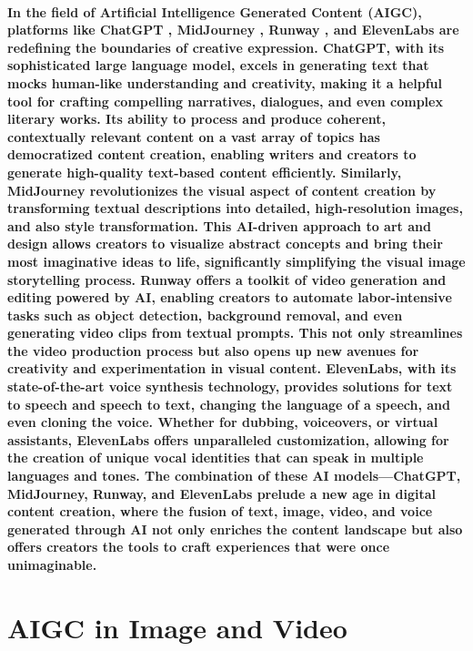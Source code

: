 \documentclass[11pt,a4paper,oneside]{report}
\begin{document}
\paragraph{In the field of Artificial Intelligence Generated Content (AIGC), platforms like ChatGPT \cite{leiter2023chatgpt} \cite{openai2023gpt}, MidJourney \cite{MidjourneyExplore}, Runway \cite{runwayml}, and ElevenLabs \cite{elevenlabs} are redefining the boundaries of creative expression. 
ChatGPT, with its sophisticated large language model, excels in generating text that mocks human-like understanding and creativity, making it a helpful tool for crafting compelling narratives, dialogues, and even complex literary works. 
Its ability to process and produce coherent, contextually relevant content on a vast array of topics has democratized content creation, enabling writers and creators to generate high-quality text-based content efficiently. 
Similarly, MidJourney revolutionizes the visual aspect of content creation by transforming textual descriptions into detailed, high-resolution images, and also style transformation.
This AI-driven approach to art and design allows creators to visualize abstract concepts and bring their most imaginative ideas to life, significantly simplifying the visual image storytelling process. 
Runway offers a toolkit of video generation and editing powered by AI, enabling creators to automate labor-intensive tasks such as object detection, background removal, and even generating video clips from textual prompts. 
This not only streamlines the video production process but also opens up new avenues for creativity and experimentation in visual content. 
ElevenLabs, with its state-of-the-art voice synthesis technology, provides solutions for text to speech and speech to text, changing the language of a speech, and even cloning the voice.
Whether for dubbing, voiceovers, or virtual assistants, ElevenLabs offers unparalleled customization, allowing for the creation of unique vocal identities that can speak in multiple languages and tones. 
The combination of these AI models—ChatGPT, MidJourney, Runway, and ElevenLabs prelude a new age in digital content creation, where the fusion of text, image, video, and voice generated through AI not only enriches the content landscape but also offers creators the tools to craft experiences that were once unimaginable.
}

\section{AIGC in Image and Video}
\end{document}
